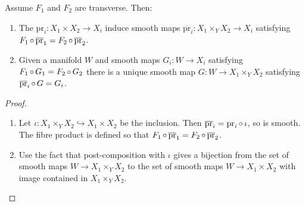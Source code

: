 \documentclass[a4paper,11pt]{article}
\begin{document}
	\begin{prop}
		Assume $F_1$ and $F_2$ are transverse. Then:
		\begin{enumerate}
			\item The $\mathrm{pr}_i : X_1 \times X_2 \to X_i$ induce smooth maps $\mathrm{\overline{pr}}_i : X_1 \times_Y X_2 \to X_i$ satisfying $F_1 \operatorname{\circ} \mathrm{\overline{pr}}_1 = F_2 \operatorname{\circ} \mathrm{\overline{pr}}_2$. 
			\item Given a manifold $W$ and smooth maps $G_i: W \to X_i$ satisfying $F_1 \operatorname{\circ} G_1 = F_2 \operatorname{\circ} G_2$ there is a unique smooth map $G : W \to X_1 \times_Y X_2$ satisfying $\mathrm{\overline{pr}}_i \operatorname{\circ} G = G_i$.
			\begin{center}
			\end{center} 
		\end{enumerate}
	\end{prop}
	\begin{proof}
		\ 
		\begin{enumerate}
			\item Let $\iota : X_1 \times_Y X_2 \hookrightarrow X_1 \times X_2$ be the inclusion. Then $\mathrm{\overline{pr}}_i = \mathrm{pr}_i \operatorname{\circ} \iota$, so is smooth. The fibre product is defined so that $F_1 \operatorname{\circ} \mathrm{\overline{pr}}_1 = F_2 \operatorname{\circ} \mathrm{\overline{pr}}_2$.
			\item Use the fact that post-composition with $\iota$ gives a bijection from the set of smooth maps $W \to X_1 \times_Y X_2$ to the set of smooth maps $W \to X_1 \times X_2$ with image contained in $X_1 \times_Y X_2$.
		\end{enumerate}
	\end{proof}
\end{document}

